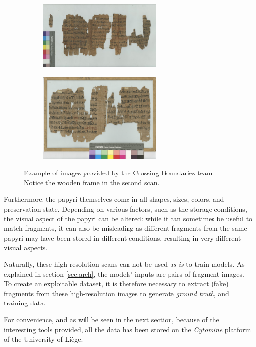 \documentclass[11pt]{report}
\begin{document}
\begin{figure}[h!]
\centering
  \begin{subfigure}{7cm}
    \centering\includegraphics[width=6cm]{papy.PNG}
  \end{subfigure}
  \begin{subfigure}{7cm}
    \centering\includegraphics[width=6cm]{papy2.png}
  \end{subfigure}
\caption{Example of images provided by the Crossing Boundaries team. Notice the wooden frame in the second scan.}
\label{imageex}
\end{figure}

Furthermore, the papyri themselves come in all shapes, sizes, colors, and preservation state. Depending on various factors, such as the storage conditions, the visual aspect of the papyri can be altered: while it can sometimes be useful to match fragments, it can also be misleading as different fragments from the same papyri may have been stored in different conditions, resulting in very different visual aspects.\newline

Naturally, these high-resolution scans can not be used \emph{as is} to train models. As explained in section \ref{sec:arch}, the models' inputs are pairs of fragment images. To create an exploitable dataset, it is therefore necessary to extract  (fake) fragments from these high-resolution images to generate \emph{ground truth}, and training data.\newline

For convenience, and as will be seen in the next section, because of the interesting tools provided, all the data has been stored on the \emph{Cytomine} platform of the University of Liège.
\end{document}
